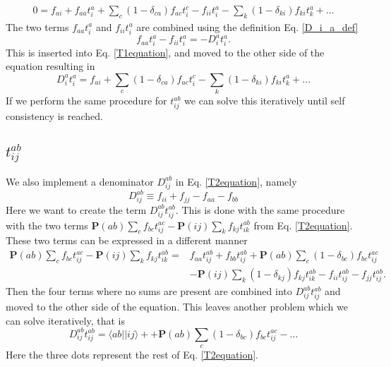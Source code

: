 \documentclass[a4paper,norsk,11pt,twoside]{report}
\begin{document}
\begin{align}
0 = f_{ai} + f_{aa} t_i^a + \sum_c 
(1 - \delta_{ca} ) f_{ac} t_i^c - f_{ii} t_i^a - \sum_k (1 - \delta_{ki}) f_{ki} t_k^a + \dots \nonumber
\end{align}
The two terms $f_{aa} t_i^a$ and $f_{ii} t_i^a$ are combined using the definition Eq. \eqref{D_i_a_def}
\begin{equation}
f_{aa} t_i^a - f_{ii} t_i^a = -D_i^a t_i^a .
\end{equation}
This is inserted into Eq. \eqref{T1equation}, and moved to the other side of the equation resulting in
\begin{equation}
D_i^a t_i^a = f_{ai} + \sum_c 
(1 - \delta_{ca} ) f_{ac} t_i^c - \sum_k (1 - \delta_{ki}) f_{ki} t_k^a + \dots
\end{equation}
If we perform the same procedure for $t_{ij}^{ab}$ we can solve this iteratively until self consistency is reached.

\subsection{$t_{ij}^{ab}$}
We also implement a denominator $D_{ij}^{ab}$ in Eq. \eqref{T2equation}, namely
\begin{equation}
D_{ij}^{ab} \equiv f_{ii} + f_{jj} - f_{aa} - f_{bb}
\end{equation}
Here we want to create the term $D_{ij}^{ab} t_{ij}^{ab}$. This is
done with the same procedure with the two terms $\textbf{P}(ab) \sum_c
f_{bc} t_{ij}^{ac} - \textbf{P}(ij) \sum_k f_{kj} t_{ik}^{ab}$ from
Eq. \eqref{T2equation}. These two terms can be expressed in a
different manner
\begin{align}
\textbf{P}(ab) \sum_c f_{bc} t_{ij}^{ac}
- \textbf{P}(ij) \sum_k f_{kj} t_{ik}^{ab} = & 
f_{aa} t_{ij}^{ab} + f_{bb} t_{ij}^{ab} + 
\textbf{P}(ab) \sum_c (1-\delta_{bc}) f_{bc} t_{ij}^{ac} \nonumber \\ &
- \textbf{P}(ij) \sum_k (1-\delta_{kj}) f_{kj} t_{ik}^{ab}
- f_{ii} t_{ij}^{ab}
- f_{jj} t_{ij}^{ab} . \nonumber
\end{align}
Then the four terms where no sums are present are combined into $D_{ij}^{ab} t_{ij}^{ab}$ and moved to the other side of the equation. This leaves another problem which we can solve iteratively, that is
\begin{equation}
D_{ij}^{ab} t_{ij}^{ab} = \langle ab||ij \rangle + + 
\textbf{P}(ab) \sum_c (1-\delta_{bc}) f_{bc} t_{ij}^{ac} - \dots \nonumber
\end{equation}
Here the three dots represent the rest of Eq. \eqref{T2equation}.
\end{document}
